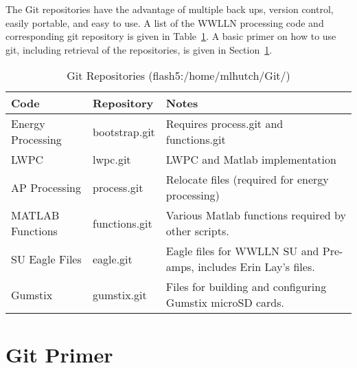 The Git repositories have the advantage of multiple back ups, version control, easily portable, and easy to use.
A list of the WWLLN processing code and corresponding git repository is given in Table~\ref{code:table:repo}.
A basic primer on how to use git, including retrieval of the repositories, is given in Section~\ref{code:section:primer}.

\begin{table}[h!]
\caption{Git Repositories (flash5:/home/mlhutch/Git/)}
\begin{center}
\begin{tabular}{|p{1.5in}|p{1in}|p{3in}|}

\hline
{\bf Code} &	{\bf Repository} &	{\bf Notes}\\

\hline
\rule{0pt}{3ex}
Energy Processing	&bootstrap.git	&	Requires process.git and functions.git \\ 


\hline
\rule{0pt}{3ex}
LWPC	&lwpc.git	&	LWPC and Matlab implementation\\ 

\hline
\rule{0pt}{3ex}
AP Processing	&process.git	&	Relocate files (required for energy processing)\\ 

\hline
\rule{0pt}{3ex}
MATLAB Functions	&functions.git	&	Various Matlab functions required by other scripts.\\ 

\hline
\rule{0pt}{3ex}
SU Eagle Files	&eagle.git	&	Eagle files for WWLLN SU and Pre-amps, includes Erin Lay's files.\\ 

\hline
\rule{0pt}{3ex}
Gumstix	&gumstix.git	&	Files for building and configuring Gumstix microSD cards.\\ 


\hline
\end{tabular}
\end{center}
\label{code:table:repo}
\end{table}

\section{Git Primer}
\label{code:section:primer}

